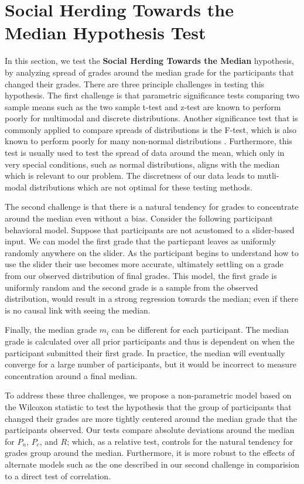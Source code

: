 \section{Social Herding Towards the Median Hypothesis Test}\label{ht}
In this section, we test the \textbf{Social Herding Towards the Median} hypothesis, by analyzing spread of grades around the median grade for the participants that changed their grades.
There are three principle challenges in testing this hypothesis.
The first challenge is that parametric significance tests comparing two sample means such as the two sample t-test and z-test are known to 
perform poorly for multimodal and discrete distributions.
Another significance test that is commonly applied to compare spreads of distributions is the F-test, which is also known to perform poorly for many non-normal distributions \cite{markowski1990conditions}.
Furthermore, this test is usually used to test the spread of data around the mean, which only in very special conditions, such as normal distributions, aligns with the median which is relevant to our problem. 
The discretness of our data leads to mutli-modal distributions which are not optimal for these testing methods.

The second challenge is that there is a natural tendency for grades to concentrate around the median even without a bias.
Consider the following participant behavioral model.
Suppose that participants are not acustomed to a slider-based input.
We can model the first grade that the particpant leaves as uniformly randomly anywhere on the slider.
As the participant begins to understand how to use the slider their use becomes more accurate, ultimately settling on a grade from our observed distribution of final grades.
This model, the first grade is uniformly random and the second grade is a sample from the observed distribution, would result in a strong regression towards the median; even if there is no causal link with seeing the median.

Finally, the median grade $m_i$ can be different for each participant.
The median grade is calculated over all prior participants and thus is dependent on when the participant submitted their first grade.
In practice, the median will eventually converge for a large number of participants, but it would be incorrect to measure concentration around a final median.

To address these three challenges, we propose a non-parametric model based on the Wilcoxon statistic to test the hypothesis that the group of participants that changed their grades are more tightly centered around the median grade that the participants observed.
Our tests compare absolute deviations around the median for $P_n$, $P_c$, and $R$; which, as a relative test, controls for the natural tendency for grades group around the median.
Furthermore, it is more robust to the effects of alternate models such as the one described in our second challenge in comparision to a direct test of correlation.

